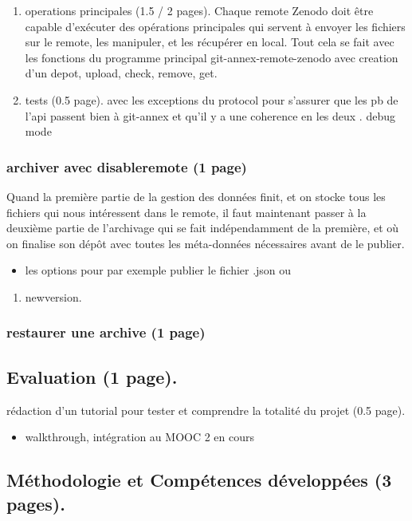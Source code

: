 \documentclass[11pt]{article}
\begin{document}
\begin{enumerate}
\item operations principales (1.5 / 2 pages).
\label{sec:org84c71d4}
Chaque remote Zenodo doit être capable d'exécuter des opérations
principales qui servent à envoyer les fichiers sur le remote, les
manipuler, et les récupérer en local. Tout cela se fait avec les
fonctions du programme principal git-annex-remote-zenodo avec 
creation d'un depot, upload, check, remove, get.
\item tests (0.5 page).
\label{sec:org151a078}
avec les exceptions du protocol pour s'assurer que les pb de l'api
passent bien à git-annex et qu'il y a une coherence en les deux .
debug mode
\end{enumerate}
\subsubsection{archiver avec disableremote (1 page)}
\label{sec:org4f3fe05}
Quand la première partie de la gestion des données finit, et on stocke
tous les fichiers qui nous intéressent dans le remote, il faut
maintenant passer à la deuxième partie de l'archivage qui se fait
indépendamment de la première, et où on finalise son dépôt avec toutes
les méta-données nécessaires avant de le publier.
\begin{itemize}
\item les options pour par exemple publier le fichier .json ou
\end{itemize}
\begin{enumerate}
\item newversion.
\label{sec:orga088b16}
\end{enumerate}
\subsubsection{restaurer une archive (1 page)}
\label{sec:org28508bd}

\subsection{Evaluation (1 page).}
\label{sec:org09c4325}
rédaction d'un tutorial pour tester et comprendre la totalité du projet (0.5 page).
\begin{itemize}
\item walkthrough, intégration au MOOC 2 en cours
\end{itemize}
\subsection{Méthodologie et Compétences développées (3 pages).}
\label{sec:orga27841d}
\end{document}
